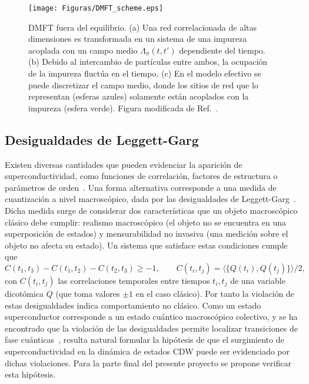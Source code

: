 \documentclass[a4paper,10pt]{article}
\begin{document}
\begin{figure}[t]
\begin{center}
\texttt{[image: Figuras/DMFT\_scheme.eps]}
\caption{\label{dmft_scheme} DMFT fuera del equilibrio. (a) Una red correlacionada de altas dimensiones es transformada en un sistema de una impureza acoplada con un campo medio $\Lambda_{\sigma}(t,t')$ dependiente del tiempo. (b) Debido al intercambio de part\'iculas entre ambos, la ocupaci\'on de la impureza fluct\'ua en el tiempo. (c) En el modelo efectivo se puede discretizar el campo medio, donde los sitios de red que lo representan (esferas azules) solamente est\'an acoplados con la impureza (esfera verde). Figura modificada de Ref.~\cite{juha2016sci}.} 
\end{center}
\end{figure}

\subsection{Desigualdades de Leggett-Garg}
Existen diversas cantidades que pueden evidenciar la aparici\'on de superconductividad, como funciones de correlaci\'on, factores de estructura o par\'ametros de orden~\cite{jonathan2016,sentef2017prl}. Una forma alternativa corresponde a una medida de cuantizaci\'on a nivel macrosc\'opico, dada por las desigualdades de Leggett-Garg~\cite{lgi_original,emary2014rpp}. Dicha medida surge de considerar dos caracter\'isticas que un objeto macrosc\'opico cl\'asico debe cumplir: realismo macrosc\'opico (el objeto no se encuentra en una superposici\'on de estados) y mensurabilidad no invasiva (una medici\'on sobre el objeto no afecta su estado). Un sistema que satisface estas condiciones cumple que
\begin{equation} \label{lgi}
C(t_1,t_3)-C(t_1,t_2)-C(t_2,t_3)\geq-1,\qquad C(t_i,t_j)=\langle\{Q(t_i),Q(t_j)\}\rangle/2,
\end{equation}
con $C(t_i,t_j)$ las correlaciones temporales entre tiempos $t_i,t_j$ de una variable dicot\'omica $Q$ (que toma valores $\pm1$ en el caso cl\'asico). Por tanto la violaci\'on de estas desigualdades indica comportamiento no cl\'asico. Como un estado superconductor corresponde a un estado cu\'antico macrosc\'opico colectivo, y se ha encontrado que la violaci\'on de las desigualdades permite localizar transiciones de fase cu\'anticas~\cite{nosotros2016LGI}, resulta natural formular la hip\'otesis de que el surgimiento de superconductividad en la din\'amica de estados CDW puede ser evidenciado por dichas violaciones.
Para la parte final del presente proyecto se propone verificar esta hip\'otesis. 
\end{document}
